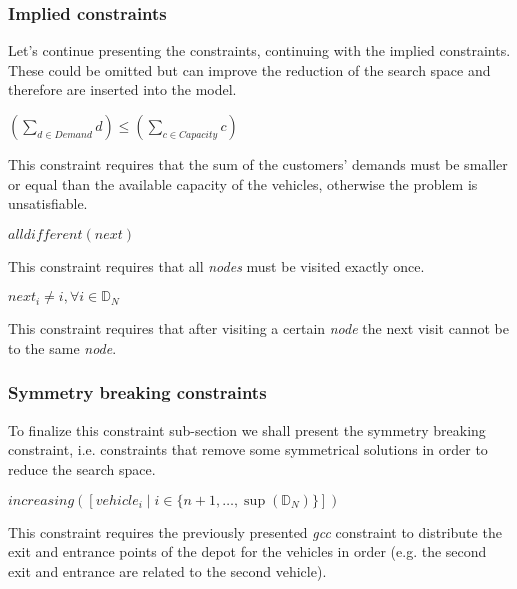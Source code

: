 \documentclass[../main.tex]{subfiles}
\begin{document}
\subsubsection{Implied constraints}
Let's continue presenting the constraints, continuing with the implied constraints. These could be omitted but can improve the reduction of the search space and therefore are inserted into the model.\\
\begin{center} %
    \begin{math}
        (\sum_{d \in Demand}{d}) \leq (\sum_{c \in Capacity}{c})
    \end{math}
\end{center}
This constraint requires that the sum of the customers' demands must be smaller or equal than the available capacity of the vehicles, otherwise the problem is unsatisfiable.

\begin{center} %
    \begin{math}
        alldifferent(next)
    \end{math}
\end{center}
This constraint requires that all \textit{nodes} must be visited exactly once.

\begin{center}
    \begin{math}
        next_i \neq i, \forall i \in \mathbb{D}_N
    \end{math}
\end{center}
This constraint requires that after visiting a certain \textit{node} the next visit cannot be to the same \textit{node}.

\subsubsection{Symmetry breaking constraints}
To finalize this constraint sub-section we shall present the symmetry breaking constraint, i.e. constraints that remove some symmetrical solutions in order to reduce the search space.
\begin{center} %
    \begin{math}
        increasing([vehicle_i \; | \; i \in \{n+1,\dots,\sup{}(\mathbb{D}_N)\}])
    \end{math}
\end{center}
This constraint requires the previously presented \textit{gcc} constraint to distribute the exit and entrance points of the depot for the vehicles in order (e.g. the second exit and entrance are related to the second vehicle).
\end{document}
